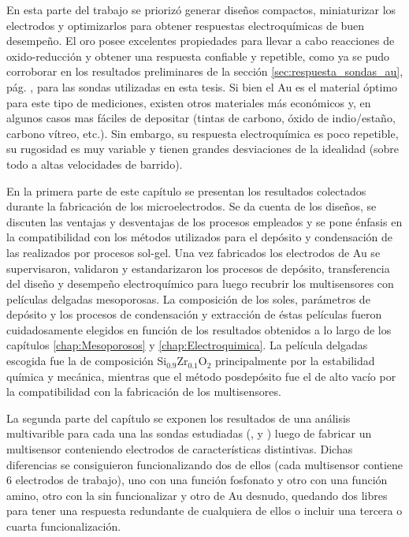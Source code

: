 	En esta parte del trabajo se priorizó generar diseños compactos, miniaturizar los electrodos y optimizarlos para obtener respuestas electroquímicas de buen desempeño. El oro posee excelentes propiedades para llevar a cabo reacciones de oxido-reducción y obtener una respuesta confiable y repetible, como ya se pudo corroborar en los resultados preliminares de la sección \ref{sec:respuesta_sondas_au}, pág. \pageref{sec:respuesta_sondas_au}, para las sondas utilizadas en esta tesis. Si bien el Au es el material óptimo para este tipo de mediciones, existen otros materiales más económicos y, en algunos casos mas fáciles de depositar (tintas de carbono, óxido de indio/estaño, carbono vítreo, etc.). Sin embargo, su respuesta electroquímica es poco repetible, su rugosidad es muy variable y tienen grandes desviaciones de la idealidad (sobre todo a altas velocidades de barrido).\cite{Wi2000,Villullas2000}

	En la primera parte de este capítulo se presentan los resultados colectados durante la fabricación de los microelectrodos. Se da cuenta de los diseños, se discuten las ventajas y desventajas de los procesos empleados y se pone énfasis en la compatibilidad con los métodos utilizados para el depósito y condensación de las \pdm\space realizados por procesos sol-gel. 
	Una vez fabricados los electrodos de Au se supervisaron, validaron y estandarizaron los procesos de depósito, transferencia del diseño y desempeño electroquímico para luego recubrir los multisensores con películas delgadas mesoporosas. La composición de los soles, parámetros de depósito y los procesos de condensación y extracción de éstas películas fueron cuidadosamente elegidos en función de los resultados obtenidos a lo largo de los capítulos \ref{chap:Mesoporosos} y \ref{chap:Electroquimica}. La película delgadas escogida fue la de composición Si$_{0.9}$Zr$_{0.1}$O$_2$ principalmente por la estabilidad química y mecánica, mientras que el método posdepósito fue el de alto vacío por la compatibilidad con la fabricación de los multisensores.

	La segunda parte del capítulo se exponen los resultados de una análisis multivarible para cada una las sondas estudiadas (\ru, \fe\space y \fc) luego de fabricar un multisensor conteniendo electrodos de características distintivas. Dichas diferencias se consiguieron funcionalizando dos de ellos (cada multisensor contiene 6 electrodos de trabajo), uno con una función fosfonato y otro con una función amino, otro con la \pdm\space sin funcionalizar y otro de Au desnudo, quedando dos libres para tener una respuesta redundante de cualquiera de ellos o incluir una tercera o cuarta funcionalización.  

